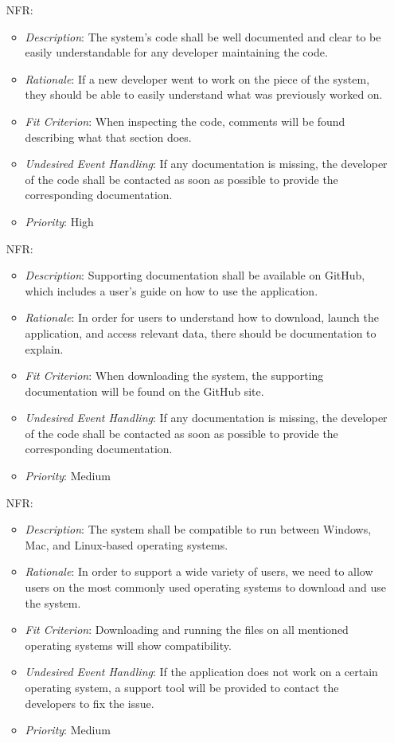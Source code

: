 \documentclass[12pt]{article}
\newcounter{nfrnum} %
\begin{document}
\begin{itemize}
\item[NFR\refstepcounter{nfrnum}\thenfrnum \label{NFR_18}:] 
\begin{itemize}
  \item \textit{Description}: The system’s code shall be well documented and clear to be easily understandable for any developer maintaining the code.
  \item \textit{Rationale}: If a new developer went to work on the piece of the system, they should be able to easily understand what was previously worked on.
  \item \textit{Fit Criterion}: When inspecting the code, comments will be found describing what that section does.
  \item \textit{Undesired Event Handling}: If any documentation is missing, the developer of the code shall be contacted as soon as possible to provide the corresponding documentation.
  \item \textit{Priority}: High
\end{itemize}

\item[NFR\refstepcounter{nfrnum}\thenfrnum \label{NFR_19}:] 
\begin{itemize}
  \item \textit{Description}: Supporting documentation shall be available on GitHub, which includes a user’s guide on how to use the application.
  \item \textit{Rationale}: In order for users to understand how to download, launch the application, and access relevant data, there should be documentation to explain.
  \item \textit{Fit Criterion}: When downloading the system, the supporting documentation will be found on the GitHub site. 
  \item \textit{Undesired Event Handling}: If any documentation is missing, the developer of the code shall be contacted as soon as possible to provide the corresponding documentation.
  \item \textit{Priority}: Medium
\end{itemize}

\item[NFR\refstepcounter{nfrnum}\thenfrnum \label{NFR_20}:] 
\begin{itemize}
  \item \textit{Description}: The system shall be compatible to run between Windows, Mac, and Linux-based operating systems.
  \item \textit{Rationale}: In order to support a wide variety of users, we need to allow users on the most commonly used operating systems to download and use the system.
  \item \textit{Fit Criterion}: Downloading and running the files on all mentioned operating systems will show compatibility.
  \item \textit{Undesired Event Handling}: If the application does not work on a certain operating system, a support tool will be provided to contact the developers to fix the issue.
  \item \textit{Priority}: Medium
\end{itemize}


\end{itemize}
\end{document}
